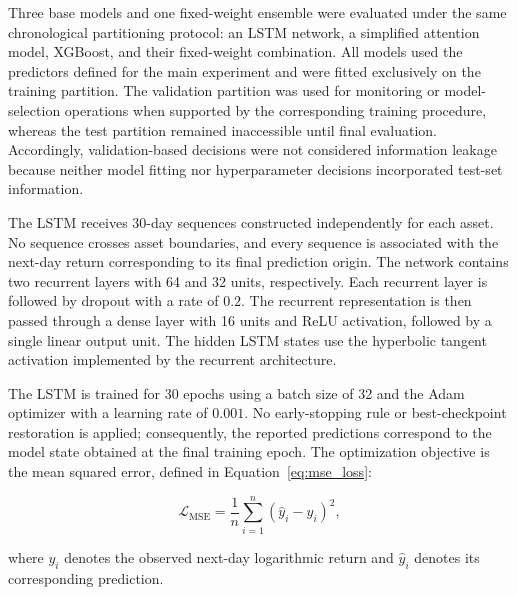 \documentclass[utf8]{FrontiersinHarvard} %
\begin{document}
Three base models and one fixed-weight ensemble were evaluated under the same chronological partitioning protocol: an LSTM network, a simplified attention model, XGBoost, and their fixed-weight combination. All models used the predictors defined for the main experiment and were fitted exclusively on the training partition. The validation partition was used for monitoring or model-selection operations when supported by the corresponding training procedure, whereas the test partition remained inaccessible until final evaluation. Accordingly, validation-based decisions were not considered information leakage because neither model fitting nor hyperparameter decisions incorporated test-set information.

The LSTM receives 30-day sequences constructed independently for each asset. No sequence crosses asset boundaries, and every sequence is associated with the next-day return corresponding to its final prediction origin. The network contains two recurrent layers with 64 and 32 units, respectively. Each recurrent layer is followed by dropout with a rate of \(0.2\). The recurrent representation is then passed through a dense layer with 16 units and ReLU activation, followed by a single linear output unit. The hidden LSTM states use the hyperbolic tangent activation implemented by the recurrent architecture.

The LSTM is trained for 30 epochs using a batch size of 32 and the Adam optimizer with a learning rate of \(0.001\). No early-stopping rule or best-checkpoint restoration is applied; consequently, the reported predictions correspond to the model state obtained at the final training epoch. The optimization objective is the mean squared error, defined in Equation~\ref{eq:mse_loss}:

\begin{equation}
	\mathcal{L}_{\mathrm{MSE}}
	=
	\frac{1}{n}
	\sum_{i=1}^{n}
	\left(\hat{y}_i-y_i\right)^2,
	\label{eq:mse_loss}
\end{equation}

where \(y_i\) denotes the observed next-day logarithmic return and \(\hat{y}_i\) denotes its corresponding prediction.
\end{document}
